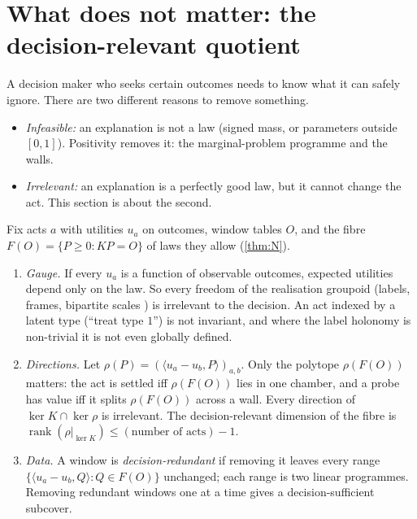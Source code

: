 \section{What does not matter: the decision-relevant quotient}\label{sec:relevance}
A decision maker who seeks certain outcomes needs to know what it can safely ignore. There are two different reasons to remove
something.
\begin{itemize}
\item \emph{Infeasible:} an explanation is not a law (signed mass, or parameters outside $[0,1]$). Positivity removes it: the
  marginal-problem programme and the walls.
\item \emph{Irrelevant:} an explanation is a perfectly good law, but it cannot change the act. This section is about the second.
\end{itemize}
Fix acts $a$ with utilities $u_a$ on outcomes, window tables $O$, and the fibre $F(O)=\{P\ge0:KP=O\}$ of laws they allow (\cref{thm:N}).

\begin{proposition}\label{prop:relevance}
\begin{enumerate}
\item[(1)] \emph{Gauge.} If every $u_a$ is a function of observable outcomes, expected utilities depend only on the law. So every
  freedom of the realisation groupoid (labels, frames, bipartite scales \cite[Proposition ``the prestack of realisations'']{CoversCompanion})
  is irrelevant to the decision. An act indexed by a latent type (``treat type $1$'') is not invariant, and where the label holonomy is
  non-trivial it is not even globally defined.
\item[(2)] \emph{Directions.} Let $\rho(P)=(\langle u_a-u_b,P\rangle)_{a,b}$. Only the polytope $\rho(F(O))$ matters: the act is settled iff
  $\rho(F(O))$ lies in one chamber, and a probe has value iff it splits $\rho(F(O))$ across a wall. Every direction of $\ker K\cap\ker\rho$
  is irrelevant. The decision-relevant dimension of the fibre is $\operatorname{rank}(\rho|_{\ker K})\le(\text{number of acts})-1$.
\item[(3)] \emph{Data.} A window is \emph{decision-redundant} if removing it leaves every range $\{\langle u_a-u_b,Q\rangle:Q\in F(O)\}$
  unchanged; each range is two linear programmes. Removing redundant windows one at a time gives a decision-sufficient subcover.
\end{enumerate}
\end{proposition}

